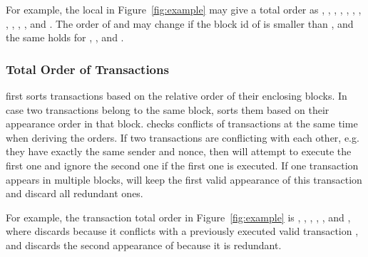For example,  the local \tg in Figure~\ref{fig:example} may give a total order as
, , , , , , , , ,  , , and .
The order of   and   may change if the block id of   is smaller than  , 
and the same holds for  , , and  .



\subsubsection{Total Order of Transactions}
\label{sec:txorder}
{\name} first sorts transactions based on the relative order of their enclosing blocks.
In case two transactions belong to the same block, {\name} sorts them based on their appearance order in that block.
{\name} checks conflicts of transactions at the same time when deriving
the orders. If two transactions are conflicting with each other, 
e.g. they have exactly the same sender and nonce, 
then {\name} will attempt to execute the first one and 
ignore the second one if the first one is executed. 
If one transaction appears in multiple blocks, {\name}
will keep the first valid appearance of this transaction and discard all redundant ones.

For example, the transaction total order in Figure~\ref{fig:example} is ,
, , , , and ,
where {\name} discards  because it conflicts with
a previously executed valid transaction , and discards the second appearance of  because it is redundant.





